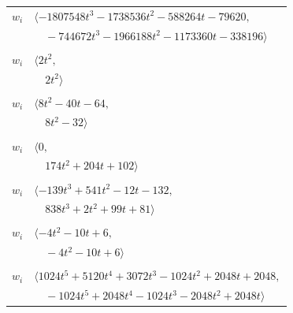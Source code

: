 \documentclass[11pt]{article}
\begin{document}
\begin{longtable}{@{}ll@{}}
$w_i$ & $\langle -1807548t^{3}-1738536t^{2}-588264t-79620,$\\
 & $\quad -744672t^{3}-1966188t^{2}-1173360t-338196\rangle$\\
\addlinespace[2pt]
\multicolumn{2}{@{}p{0.97\textwidth}@{}}{$i=50$, $D_i=1$, $\rho_{ij}$: $31{:}1, \allowbreak 32{:}2$}\\
$w_i$ & $\langle 2t^{2},$\\
 & $\quad 2t^{2}\rangle$\\
\addlinespace[2pt]
\multicolumn{2}{@{}p{0.97\textwidth}@{}}{$i=51$, $D_i=8$, $\rho_{ij}$: $1{:}2, \allowbreak 3{:}1, \allowbreak 13{:}2, \allowbreak 21{:}2, \allowbreak 24{:}1, \allowbreak 55{:}1, \allowbreak 61{:}1$}\\
$w_i$ & $\langle 8t^{2}-40t-64,$\\
 & $\quad 8t^{2}-32\rangle$\\
\addlinespace[2pt]
\multicolumn{2}{@{}p{0.97\textwidth}@{}}{$i=52$, $D_i=16$, $\rho_{ij}$: $10{:}1, \allowbreak 11{:}2, \allowbreak 12{:}2, \allowbreak 21{:}2, \allowbreak 23{:}2, \allowbreak 26{:}2, \allowbreak 40{:}1$}\\
$w_i$ & $\langle 0,$\\
 & $\quad 174t^{2}+204t+102\rangle$\\
\addlinespace[2pt]
\multicolumn{2}{@{}p{0.97\textwidth}@{}}{$i=53$, $D_i=64$, $\rho_{ij}$: $6{:}2, \allowbreak 16{:}1, \allowbreak 23{:}1, \allowbreak 24{:}2, \allowbreak 40{:}2, \allowbreak 46{:}2, \allowbreak 48{:}2, \allowbreak 60{:}1, \allowbreak 66{:}1, \allowbreak 77{:}2$}\\
$w_i$ & $\langle -139t^{3}+541t^{2}-12t-132,$\\
 & $\quad 838t^{3}+2t^{2}+99t+81\rangle$\\
\addlinespace[2pt]
\multicolumn{2}{@{}p{0.97\textwidth}@{}}{$i=54$, $D_i=8$, $\rho_{ij}$: $19{:}2, \allowbreak 26{:}1, \allowbreak 28{:}1, \allowbreak 30{:}1, \allowbreak 43{:}2, \allowbreak 56{:}2, \allowbreak 67{:}1$}\\
$w_i$ & $\langle -4t^{2}-10t+6,$\\
 & $\quad -4t^{2}-10t+6\rangle$\\
\addlinespace[2pt]
\multicolumn{2}{@{}p{0.97\textwidth}@{}}{$i=55$, $D_i=1024$, $\rho_{ij}$: $11{:}1, \allowbreak 23{:}2, \allowbreak 30{:}2, \allowbreak 38{:}2, \allowbreak 51{:}2, \allowbreak 74{:}2$}\\
$w_i$ & $\langle 1024t^{5}+5120t^{4}+3072t^{3}-1024t^{2}+2048t+2048,$\\
 & $\quad -1024t^{5}+2048t^{4}-1024t^{3}-2048t^{2}+2048t\rangle$\\

\end{longtable}
\end{document}
